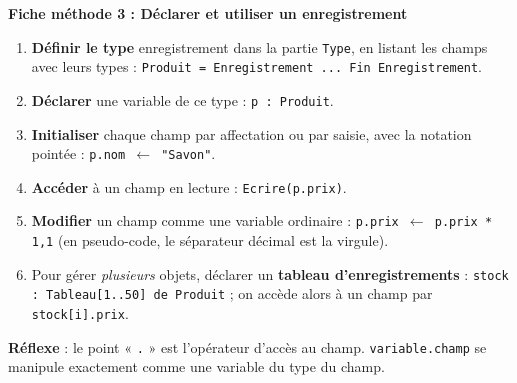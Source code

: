\documentclass[11pt]{article}
\begin{document}
\textbf{Fiche méthode 3 : Déclarer et utiliser un enregistrement}\par
\begin{methode}
\begin{enumerate}
\item \textbf{Définir le type} enregistrement dans la partie \texttt{Type}, en listant les champs avec leurs types :
\texttt{Produit = Enregistrement ... Fin Enregistrement}.
\item \textbf{Déclarer} une variable de ce type : \texttt{p : Produit}.
\item \textbf{Initialiser} chaque champ par affectation ou par saisie, avec la notation pointée : \texttt{p.nom $\leftarrow$ "Savon"}.
\item \textbf{Accéder} à un champ en lecture : \texttt{Ecrire(p.prix)}.
\item \textbf{Modifier} un champ comme une variable ordinaire : \texttt{p.prix $\leftarrow$ p.prix * 1,1} (en pseudo-code, le séparateur décimal est la virgule).
\item Pour gérer \emph{plusieurs} objets, déclarer un \textbf{tableau d'enregistrements} : \texttt{stock : Tableau[1..50] de Produit} ; on accède alors à un champ par \texttt{stock[i].prix}.
\end{enumerate}
\textbf{Réflexe} : le point « \texttt{.} » est l'opérateur d'accès au champ. \texttt{variable.champ} se manipule exactement comme une variable du type du champ.
\end{methode}
\end{document}
